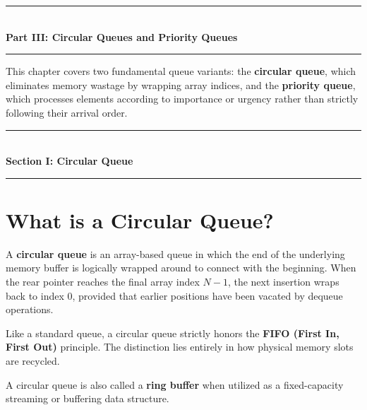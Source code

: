 \begin{center}
\vspace{1em}
{\color{primary}\rule{0.5\textwidth}{1.5pt}}\\[6pt]
{\Large\bfseries\color{primary} Part III: Circular Queues and Priority Queues}\\[3pt]
{\color{primary}\rule{0.5\textwidth}{1.5pt}}
\vspace{1em}
\end{center}

This chapter covers two fundamental queue variants: the \textbf{circular queue}, which eliminates memory wastage by wrapping array indices, and the \textbf{priority queue}, which processes elements according to importance or urgency rather than strictly following their arrival order.

\begin{center}
\vspace{0.5em}
{\color{primary}\rule{0.45\textwidth}{1.2pt}}\\[4pt]
{\Large\bfseries\color{primary} Section I: Circular Queue}\\[2pt]
{\color{primary}\rule{0.45\textwidth}{1.2pt}}
\vspace{0.5em}
\end{center}

\section{What is a Circular Queue?}

A \textbf{circular queue} is an array-based queue in which the end of the underlying memory buffer is logically wrapped around to connect with the beginning. When the rear pointer reaches the final array index $N-1$, the next insertion wraps back to index $0$, provided that earlier positions have been vacated by dequeue operations.

Like a standard queue, a circular queue strictly honors the \textbf{FIFO (First In, First Out)} principle. The distinction lies entirely in how physical memory slots are recycled.

A circular queue is also called a \textbf{ring buffer} when utilized as a fixed-capacity streaming or buffering data structure.

